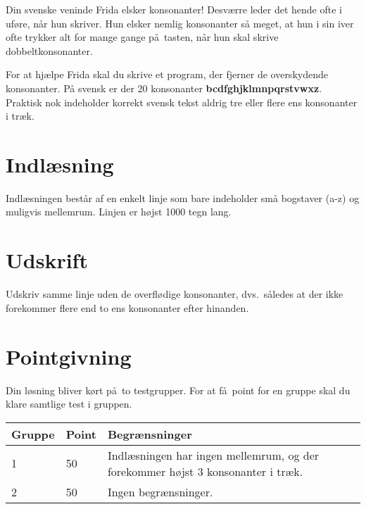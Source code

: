 Din svenske veninde Frida elsker konsonanter!
Desværre leder det hende ofte i uføre, når hun skriver.
Hun elsker nemlig konsonanter så meget, at hun i sin iver ofte trykker alt for mange gange på tasten, når hun skal skrive dobbeltkonsonanter.

For at hjælpe Frida skal du skrive et program, der fjerner de overskydende konsonanter.
På svensk er der 20 konsonanter
\textbf{bcdfghjklmnpqrstvwxz}.
Praktisk nok indeholder korrekt svensk tekst aldrig tre eller flere ens konsonanter i træk.

\section*{Indlæsning}
Indlæsningen består af en enkelt linje som bare indeholder små bogstaver (a-z) og muligvis mellemrum. 
Linjen er højst 1000 tegn lang.

\section*{Udskrift}
Udskriv samme linje uden de overflødige konsonanter, dvs.\ således at der ikke forekommer flere end to ens konsonanter efter hinanden.

\section*{Pointgivning}

Din løsning bliver kørt på to testgrupper.
For at få point for en gruppe skal du klare samtlige test i gruppen.

\noindent
\begin{tabular}{ l  l  l }
\hline
Gruppe & Point & Begrænsninger \\ \hline
1     & 50          &  Indlæsningen har ingen mellemrum, og der forekommer højst 3 konsonanter i træk.\\ 
2     & 50         &  Ingen begrænsninger. 
\end{tabular}

